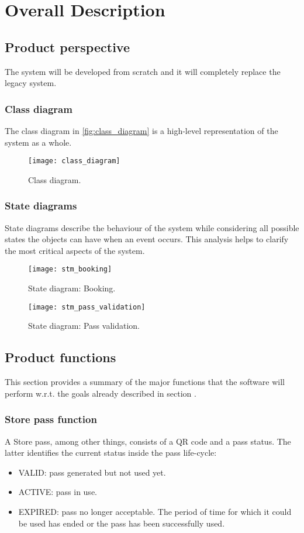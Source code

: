 \chapter{Overall Description}

\section{Product perspective}

The system will be developed from scratch and it will completely replace the legacy system.
\subsection{Class diagram}
The class diagram in \autoref{fig:class_diagram} is a high-level representation of the system as a whole.

\begin{figure}[H]\label{fig:class_diagram}
	\centering
	\texttt{[image: class\_diagram]}
	\caption{Class diagram.}
\end{figure}


\subsection{State diagrams}
State diagrams describe the behaviour of the system while considering all possible states the objects can have when an event occurs. This analysis helps to clarify the most critical aspects of the system.

\begin{figure}[H]
	\centering
	\texttt{[image: stm\_booking]}
	\caption{State diagram: Booking.}
\end{figure}

\begin{figure}[H]
	\centering
	\texttt{[image: stm\_pass\_validation]}
	\caption{State diagram: Pass validation.}
\end{figure}


\section{Product functions}\label{desc:prodFunc}
This section provides a summary of the major functions that the software will perform w.r.t. the goals already described in section .

\subsection{Store pass function}
	A Store pass, among other things, consists of a QR code and a pass status. The latter identifies the current status inside the pass life-cycle:
	\begin{itemize}
		\item VALID: pass generated but not used yet.
		\item ACTIVE: pass in use.
		\item EXPIRED: pass no longer acceptable. The period of time for which it could be used has ended or the pass has been successfully used.
	\end{itemize}

